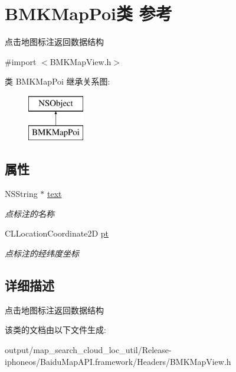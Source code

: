 \hypertarget{interface_b_m_k_map_poi}{}\section{B\+M\+K\+Map\+Poi类 参考}
\label{interface_b_m_k_map_poi}


点击地图标注返回数据结构  




{\ttfamily \#import $<$B\+M\+K\+Map\+View.\+h$>$}

类 B\+M\+K\+Map\+Poi 继承关系图\+:\begin{figure}[H]
\begin{center}
\leavevmode
\includegraphics[height=2.000000cm]{interface_b_m_k_map_poi}
\end{center}
\end{figure}
\subsection*{属性}
\begin{DoxyCompactItemize}
\item 
\hypertarget{interface_b_m_k_map_poi_a5d5c19bd352dcab43167d97aa47ea38d}{}N\+S\+String $\ast$ \hyperlink{interface_b_m_k_map_poi_a5d5c19bd352dcab43167d97aa47ea38d}{text}\label{interface_b_m_k_map_poi_a5d5c19bd352dcab43167d97aa47ea38d}

\begin{DoxyCompactList}\small\item\em 点标注的名称 \end{DoxyCompactList}\item 
\hypertarget{interface_b_m_k_map_poi_a771c0672bbe2dd1dc526003717bbcec1}{}C\+L\+Location\+Coordinate2\+D \hyperlink{interface_b_m_k_map_poi_a771c0672bbe2dd1dc526003717bbcec1}{pt}\label{interface_b_m_k_map_poi_a771c0672bbe2dd1dc526003717bbcec1}

\begin{DoxyCompactList}\small\item\em 点标注的经纬度坐标 \end{DoxyCompactList}\end{DoxyCompactItemize}


\subsection{详细描述}
点击地图标注返回数据结构 

该类的文档由以下文件生成\+:\begin{DoxyCompactItemize}
\item 
output/map\+\_\+search\+\_\+cloud\+\_\+loc\+\_\+util/\+Release-\/iphoneos/\+Baidu\+Map\+A\+P\+I.\+framework/\+Headers/B\+M\+K\+Map\+View.\+h\end{DoxyCompactItemize}
